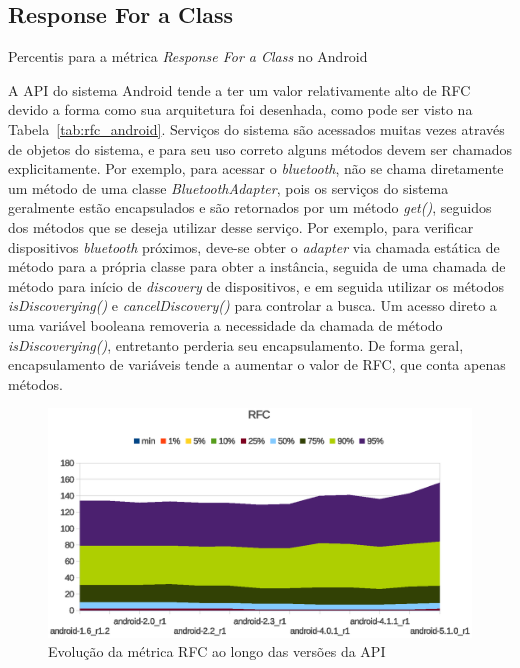 \subsection{Response For a Class}

\begin{table}[!htb]

\caption{Percentis para a métrica \textit{Response For a Class} no Android}
\label{tab:rfc_android}
\end{table}

A API do sistema Android tende a ter um valor relativamente alto de RFC devido a forma como sua arquitetura foi desenhada, como pode ser visto na Tabela~\ref{tab:rfc_android}. Serviços do sistema são acessados muitas vezes através de objetos do sistema, e para seu uso correto alguns métodos devem ser chamados explicitamente. Por exemplo, para acessar o \textit{bluetooth}, não se chama diretamente um método de uma classe \textit{BluetoothAdapter}, pois os serviços do sistema geralmente estão encapsulados e são retornados por um método \textit{get()}, seguidos dos métodos que se deseja utilizar desse serviço. Por exemplo, para verificar dispositivos \textit{bluetooth} próximos, deve-se obter o \textit{adapter} via chamada estática de método para a própria classe para obter a instância, seguida de uma chamada de método para início de \textit{discovery} de dispositivos, e em seguida utilizar os métodos \textit{isDiscoverying()} e \textit{cancelDiscovery()} para controlar a busca. Um acesso direto a uma variável booleana removeria a necessidade da chamada de método \textit{isDiscoverying()}, entretanto perderia seu encapsulamento. De forma geral, encapsulamento de variáveis tende a aumentar o valor de RFC, que conta apenas métodos. 

\begin{figure}[!htb]
\centering
\includegraphics [keepaspectratio=true,scale=0.85]{figuras/graphs/rfc_android.eps}
\caption{Evolução da métrica RFC ao longo das versões da API}
\label{fig:rfc_android}
\end{figure}

